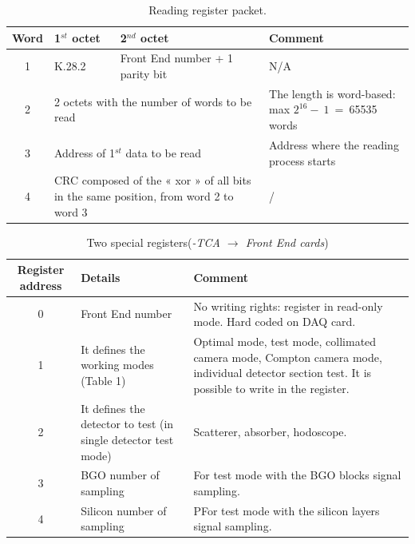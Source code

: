 \begin{table} [!htbp]
  \centering
  \caption{Reading register packet.}
\begin{tabular}{|c|p{4cm}|p{4cm}|p{4cm}|}
\hline
\bf{Word}  			& 	\bf{1$^{st}$ octet}	& \bf{2$^{nd}$ octet} & \bf{Comment} \\
\hline
1				&	K.28.2	& Front End number + 1 parity bit &  N/A \\
\hline
2				&\multicolumn{2}{p{8cm}|}{2 octets with the number of words to be read}& The length is word-based: max $2^{16}-~1$~=~65535 words\\
\hline
3 			&      \multicolumn{2}{p{8cm}|}{Address of 1$^{st}$ data to be read} & Address where the reading process starts\\
\hline
4				 & \multicolumn{2}{p{8cm}|}{CRC composed of the « xor » of all bits in the same position, from word 2 to word 3}&/\\
\hline
\end{tabular}
\end{table}

\begin{table} [!htbp]
  \centering
  \caption{Two special registers(\textit{{\charmu-TCA} $\rightarrow$  Front End cards})}
\begin{tabular}{|c|p{6cm}|p{6cm}|}
\hline
\bf{Register address}  			& 	\bf{Details}	& \bf{Comment} \\
\hline
0				&	Front End number		&  No writing rights: register in read-only mode. Hard coded on DAQ card.\\
\hline
1				&    It defines the working modes (Table 1)  & Optimal mode, test mode, collimated camera mode, Compton camera mode, individual detector section test. It is possible to write in the register.  \\
\hline
2				& It defines the detector to test (in single detector test mode)		& Scatterer, absorber, hodoscope.\\
\hline
3 				& BGO number of sampling		& For test mode with the BGO blocks signal sampling.\\
\hline
4				& Silicon number of sampling	& PFor test mode with the silicon layers signal sampling.\\
\hline
\end{tabular}
\end{table}



\newpage



